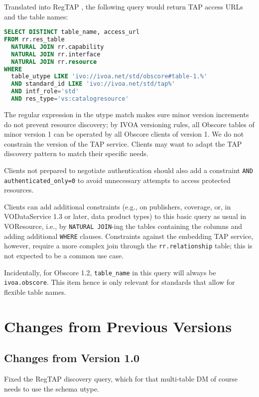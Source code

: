 \documentclass[11pt,a4paper]{ivoa}
\begin{document}
Translated into RegTAP \citep{2019ivoa.spec.1011D}, the following query
would return TAP access URLs and the table names:

\begin{lstlisting}[language=SQL]
SELECT DISTINCT table_name, access_url
FROM rr.res_table
  NATURAL JOIN rr.capability
  NATURAL JOIN rr.interface
  NATURAL JOIN rr.resource
WHERE
  table_utype LIKE 'ivo://ivoa.net/std/obscore#table-1.%'
  AND standard_id LIKE 'ivo://ivoa.net/std/tap%'
  AND intf_role='std'
  AND res_type='vs:catalogresource'
\end{lstlisting}

The regular expression in the utype match makes sure minor version
increments do not prevent resource discovery; by IVOA versioning rules,
all Obscore tables of minor version 1 can be operated by all Obscore
clients of version 1.  We do not constrain the version of the TAP
service. Clients may want to adapt the TAP discovery pattern to match
their specific needs.

Clients not prepared to negotiate authentication should also add a
constraint \verb|AND authenticated_only=0| to avoid unnecessary attempts
to access protected resources.

Clients can add additional constraints (e.g., on publishers, coverage,
or, in VODataService 1.3 or later, data product types) to this basic
query as usual in VOResource, i.e., by \verb|NATURAL JOIN|-ing the
tables containing the columns and adding additional \verb|WHERE|
clauses.  Constraints against the embedding TAP service, however,
require a more complex join through the \verb|rr.relationship| table;
this is not expected to be a common use case.

Incidentally, for Obscore 1.2, \verb|table_name| in this query will always be
\verb|ivoa.obscore|.  This item hence is only relevant for standards
that allow for flexible table names.

\appendix
\section{Changes from Previous Versions}

\subsection{Changes from Version 1.0}

Fixed the RegTAP discovery query, which for that multi-table DM of
course needs to use the schema utype.


\end{document}
